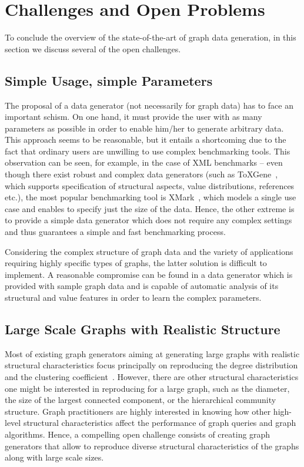 \section{Challenges and Open Problems}
\label{sec:challenges}

To conclude the  overview of the state-of-the-art of graph data generation, in this section we discuss several of the open challenges.

\subsection{Simple Usage, simple Parameters}
The proposal of a data generator (not necessarily for graph data) has to face an
important schism. On one hand, it must provide the user with as
many parameters as possible in order to enable him/her to generate
arbitrary data.
This approach seems to be reasonable, but it entails a shortcoming due to
the fact that ordinary users are
unwilling to use complex benchmarking tools. This observation can be
seen, for example, in the case of XML benchmarks -- even though there exist
robust and complex data generators (such as
ToXGene~\cite{conf/webdb/BarbosaMKL02}, which supports specification of
structural aspects, value distributions, references etc.), the most popular
benchmarking tool is XMark~\cite{Schmidt:2002:XBX:1287369.1287455}, which models
a single use case and enables to specify just the size of the data. Hence, the
other extreme is to provide a simple data generator which does not require any
complex settings and thus guarantees a simple and fast benchmarking process.

Considering the complex structure of graph data and the variety of applications
requiring highly specific types of graphs, the latter solution is difficult to
implement. A reasonable compromise can be found in a data generator which is
provided with sample graph data and is capable of automatic analysis of its
structural and value features in order to learn the complex parameters.

\subsection{Large Scale Graphs with Realistic Structure}

Most of existing graph generators aiming at generating large graphs with realistic
structural characteristics focus principally on reproducing the degree
distribution and the clustering
coefficient~\cite{kolda2014scalable,edunov2016darwini}. However, there are other
structural characteristics one might be interested in reproducing for a large
graph, such as the diameter, the size of the largest connected component, or the
hierarchical community structure. Graph practitioners are highly interested in knowing
how other high-level structural characteristics affect the performance of graph
queries and graph algorithms. Hence, a compelling open challenge consists
of creating
graph generators that allow to reproduce diverse structural characteristics
of the graphs along with large scale sizes.


